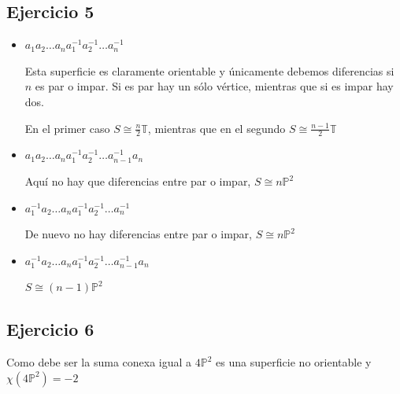 \documentclass{article}
\begin{document}
\subsection{Ejercicio 5}
\begin{itemize}
\item $a_1a_2\ldots a_na_1^{-1}a_2^{-1}\ldots a_n^{-1}$

Esta superficie es claramente orientable y únicamente debemos diferencias si $n$ es par o impar. Si es par hay un sólo vértice, mientras que si es impar hay dos.

En el primer caso $S\cong \frac{n}{2}\mathbb{T}$, mientras que en el segundo $S\cong \frac{n-1}{2}\mathbb{T}$

\item $a_1a_2\ldots a_na_1^{-1}a_2^{-1}\ldots a_{n-1}^{-1}a_n$

Aquí no hay que diferencias entre par o impar, $S\cong n\mathbb{P}^2$

\item $a_1^{-1}a_2\ldots a_na_1^{-1}a_2^{-1}\ldots a_n^{-1}$

De nuevo no hay diferencias entre par o impar, $S\cong n\mathbb{P}^2$

\item $a_1^{-1}a_2\ldots a_na_1^{-1}a_2^{-1}\ldots a_{n-1}^{-1}a_n$

$S\cong (n-1)\mathbb{P}^2$
\end{itemize}

\subsection{Ejercicio 6}
Como debe ser la suma conexa igual a $4\mathbb{P}^2$ es una superficie no orientable y $\chi(4\mathbb{P}^2)=-2$\\
\end{document}
